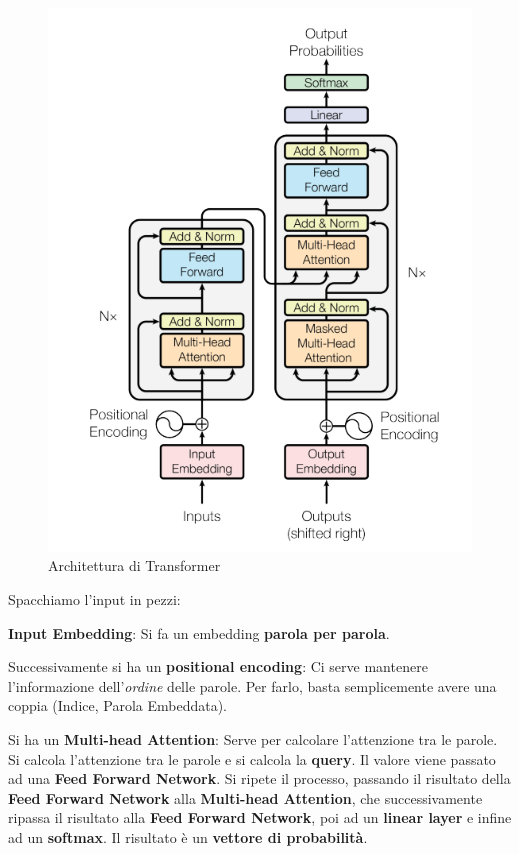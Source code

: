 \begin{figure}[H]
    \begin{center}
        \includegraphics[width=0.8\linewidth]{images/transformer.png}
    \end{center}
    \caption{Architettura di Transformer}
\end{figure}

Spacchiamo l'input in pezzi:

\textbf{Input Embedding}: Si fa un embedding \textbf{parola per parola}.

Successivamente si ha un \textbf{positional encoding}: Ci serve mantenere l'informazione dell'\textit{ordine} delle parole. Per farlo, basta semplicemente 
avere una coppia (Indice, Parola Embeddata).

Si ha un \textbf{Multi-head Attention}: Serve per calcolare l'attenzione tra le parole. Si calcola l'attenzione tra le parole e si calcola la \textbf{query}.
Il valore viene passato ad una \textbf{Feed Forward Network}. Si ripete il processo, passando il risultato della \textbf{Feed Forward Network} alla \textbf{Multi-head Attention}, che 
successivamente ripassa il risultato alla \textbf{Feed Forward Network}, poi ad un \textbf{linear layer} e infine ad un \textbf{softmax}. Il risultato è un \textbf{vettore di probabilità}.


